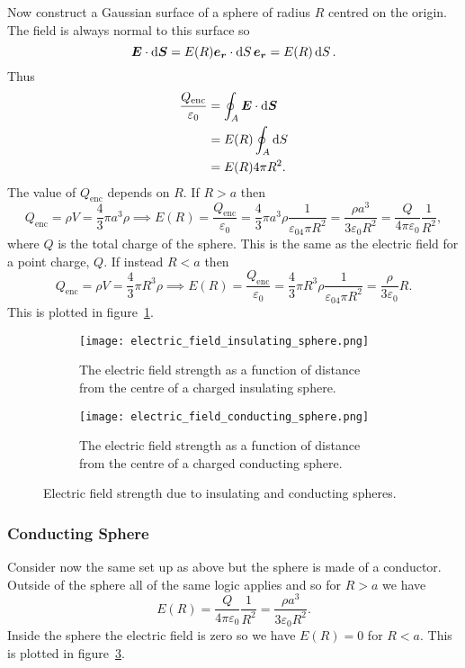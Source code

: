     Now construct a Gaussian surface of a sphere of radius \(R\) centred on the origin.
    The field is always normal to this surface so
    \[\bm{E}\cdot\dd{\bm{S}} =  E(R)\bm{e_{r}}\cdot\dd{S}\bm{e_{r}} = E(R)\dd{S}.\]
    Thus
    \begin{align*}
        \frac{Q_\mathrm{enc}}{\varepsilon_0} &= \oint_A \bm{E}\cdot\dd{\bm{S}}\\
        &= E(R)\oint_A\dd{S}\\
        &= E(R)4\pi R^2.
    \end{align*}
    The value of \(Q_\mathrm{enc}\) depends on \(R\).
    If \(R > a\) then
    \[Q_\mathrm{enc} = \rho V = \frac{4}{3}\pi a^3\rho \implies E(R) = \frac{Q_\mathrm{enc}}{\varepsilon_0} = \frac{4}{3}\pi a^3\rho \frac{1}{\varepsilon_04\pi R^2} = \frac{\rho a^3}{3\varepsilon_0 R^2} = \frac{Q}{4\pi\varepsilon_0}\frac{1}{R^2},\]
    where \(Q\) is the total charge of the sphere.
    This is the same as the electric field for a point charge, \(Q\).
    If instead \(R < a\) then
    \[Q_\mathrm{enc} = \rho V = \frac{4}{3}\pi R^3\rho \implies E(R) = \frac{Q_\mathrm{enc}}{\varepsilon_0} = \frac{4}{3}\pi R^3\rho \frac{1}{\varepsilon_04\pi R^2} = \frac{\rho}{3\varepsilon_0}R.\]
    This is plotted in figure~\ref{fig:electric field strength insulating sphere}.
    \begin{figure}[ht]
        \centering
        \begin{subfigure}{0.4\textwidth}
            \centering
            \texttt{[image: electric\_field\_insulating\_sphere.png]}
            \caption{The electric field strength as a function of distance from the centre of a charged insulating sphere.}
            \label{fig:electric field strength insulating sphere}
        \end{subfigure}
        \begin{subfigure}{0.4\textwidth}
            \centering
            \texttt{[image: electric\_field\_conducting\_sphere.png]}
            \caption{The electric field strength as a function of distance from the centre of a charged conducting sphere.}
            \label{fig:electric field strength conducting sphere}
        \end{subfigure}
        \caption{Electric field strength due to insulating and conducting spheres.}
    \end{figure}
    \subsubsection{Conducting Sphere}
    Consider now the same set up as above but the sphere is made of a conductor.
    Outside of the sphere all of the same logic applies and so for \(R > a\) we have
    \[E(R) = \frac{Q}{4\pi\varepsilon_0}\frac{1}{R^2} = \frac{\rho a^3}{3\varepsilon_0 R^2}.\]
    Inside the sphere the electric field is zero so we have \(E(R) = 0\) for \(R < a\).
    This is plotted in figure~\ref{fig:electric field strength conducting sphere}.
    
